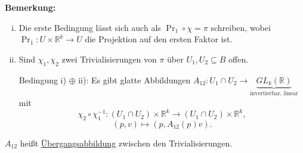 \documentclass[fleqn, 12pt, letterpaper]{article}
\newcommand{\txt}[1]{\text{#1}}
\begin{document}
\textbf{Bemerkung:}
\begin{enumerate}[i)]
    \item Die erste Bedingung lässt sich auch als \(\Pr_1 \circ \chi = \pi\) schreiben, wobei \(\Pr_1 : U\times\mathbb{R}^k \to U\) die Projektion auf den ersten Faktor ist.
    
    \item Sind \(\chi_1, \chi_2\) zwei Trivialisierungen von \(\pi\) über \(U_1, U_2 \subseteq B\) offen.
    
    Bedingung i) \(\oplus\) ii): Es gibt glatte Abbildungen \(A_{12}: U_1 \cap U_2 \to \underbrace{GL_k(\mathbb{R})}_{\txt{invertierbar, linear}}\) mit
    \[
    \chi_2 \circ \chi_1^{-1}: (U_1 \cap U_2) \times \mathbb{R}^k \to (U_1 \cap U_2) \times \mathbb{R}^k,
    \]
    \[
    (p,v) \mapsto (p, A_{12}(p)v).
    \]
\end{enumerate}

\(A_{12}\) heißt \underline{Übergangsabbildung} zwischen den Trivialisierungen.\\
\end{document}
